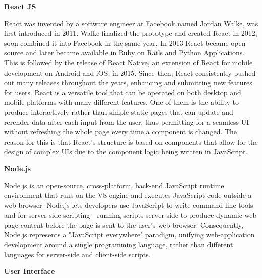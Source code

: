 \bigskip
{\textbf{React JS}}
\bigskip

React was invented by a software engineer at Facebook named Jordan Walke, was first introduced in 2011. Walke finalized the prototype and created React in 2012, soon combined it into Facebook in the same year. In 2013 React became open-source and later became available in Ruby on Rails and Python Applications. This is followed by the release of React Native, an extension of React for mobile development on Android and iOS, in 2015. Since then, React consistently pushed out many releases throughout the years, enhancing and submitting new features for users. React is a versatile tool that can be operated on both desktop and mobile platforms with many different features. One of them is the ability to produce interactively rather than simple static pages that can update and rerender data after each input from the user, thus permitting for a seamless UI without refreshing the whole page every time a component is changed. The reason for this is that React’s structure is based on components that allow for the design of complex UIs due to the component logic being written in JavaScript.

\bigskip
{\textbf{Node.js}}
\bigskip

Node.js is an open-source, cross-platform, back-end JavaScript runtime environment that runs on the V8 engine and executes JavaScript code outside a web browser. Node.js lets developers use JavaScript to write command line tools and for server-side scripting—running scripts server-side to produce dynamic web page content before the page is sent to the user's web browser. Consequently, Node.js represents a "JavaScript everywhere" paradigm, unifying web-application development around a single programming language, rather than different languages for server-side and client-side scripts. 

\bigskip
{\textbf{User Interface}}
\bigskip

